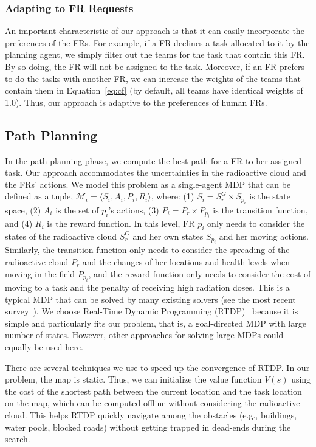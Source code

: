 \subsubsection{Adapting to FR Requests}\label{sec:adaptive}
\noindent An important characteristic of our approach is that it can easily
incorporate the preferences of the FRs. For example, if a
FR declines a task allocated to it by the planning agent, we
simply filter out the teams for the task that contain this
FR. By so doing, the FR will not be assigned to the
task. Moreover, if an FR prefers to do the tasks with another
FR, we can increase the weights of the teams that
contain them in Equation~\ref{eq:cf} (by default, all teams
have identical weights of 1.0). Thus, our approach is adaptive to the
 preferences of human FRs.

\subsection{Path Planning}
\label{sec:pathplanning}

\noindent In the path planning phase, we compute the best path for a
FR to her assigned task.  Our approach accommodates the
uncertainties in the radioactive cloud and the FRs' actions. We
model this problem as a single-agent MDP that can be defined as a
tuple, $\mathcal{M}_i = \langle S_i, A_i, P_i, R_i \rangle$, where:
(1) $S_i = S^G_r \times S_{p_i}$ is the state space, (2) $A_i$ is the
set of $p_i$'s actions, (3) $P_i = P_r \times P_{p_i}$ is the
transition function, and (4) $R_i$ is the reward function. In this
level, FR $p_i$ only needs to consider the states of the
radioactive cloud $S^G_r$ and her own states $S_{p_i}$ and her moving
actions. Similarly, the transition function only needs to consider the
spreading of the radioactive cloud $P_r$ and the changes of her
locations and health levels when moving in the field $P_{p_i}$, and
the reward function only needs to consider the cost of moving to a
task and the penalty of receiving high radiation doses. This is a
typical MDP that can be solved by many existing solvers (see the most
recent survey~\cite{kolobov2012planning}). We choose Real-Time Dynamic
Programming (RTDP)~\cite{barto1995learning} because it is simple and
particularly fits our problem, that is, a goal-directed MDP with large
number of states. However, other approaches for solving large MDPs
could equally be used here.

There are several techniques we use to speed up the convergence of
RTDP. In our problem, the map is static. Thus, we can initialize
the value function $V(s)$ using the cost of the shortest path
between the current location and the task location on the map, which
can be computed offline without considering the radioactive cloud.
This helps RTDP quickly navigate among the obstacles (e.g.,
buildings, water pools, blocked roads) without getting trapped in
dead-ends during the search. 

